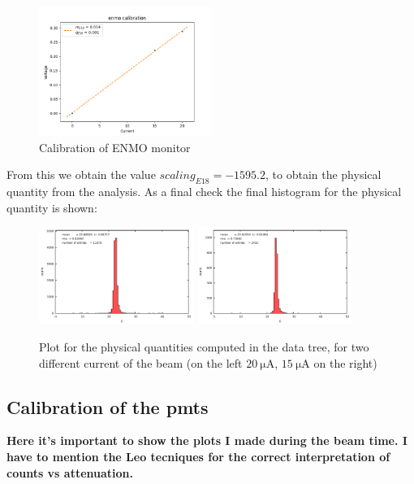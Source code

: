 \begin{figure}[hbtp]
\centering
\includegraphics[width = 0.5\textwidth]{Analysis/E18_Calibration.png}
\caption{Calibration of ENMO monitor}
\end{figure}

From this we obtain the value $scaling_{E18} = -1595.2$, to obtain the physical quantity from the analysis. As a final check the final histogram for the physical quantity is shown:

\begin{figure}[hbtp]
\centering
\includegraphics[width = 0.45\textwidth]{Analysis/ENMOCheck20.pdf}
\includegraphics[width = 0.45\textwidth]{Analysis/ENMOCheck15.pdf} 
\caption{Plot for the physical quantities computed in the data tree, for two different current of the beam (on the left $\SI{20}{\micro \ampere}$, $\SI{15}{\micro \ampere}$ on the right)}
\end{figure}



\subsection{Calibration of the pmts}

{\bfseries Here it's important to show the plots I made during the beam time. I have to mention the Leo tecniques for the correct interpretation of counts vs attenuation.}

